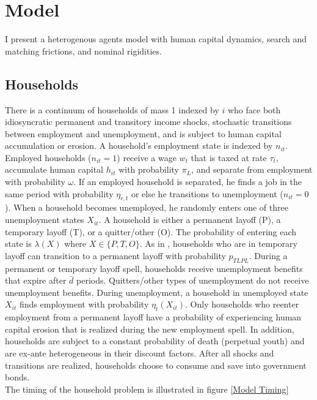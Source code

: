 
\section{Model} 


I present a heterogenous agents model with human capital dynamics, search and matching frictions, and nominal rigidities. 

\subsection{Households}
\label{subsec:Households}

There is a continuum of households of mass 1 indexed by $i$ who face both idiosyncratic permanent and transitory income shocks, stochastic transitions between employment and unemployment, and is subject to human capital accumulation or erosion. A household's employment state is indexed by $n_{it}$. Employed households ($n_{it} = 1$) receive a wage $w_{t}$ that is taxed at rate $\tau_{t}$, accumulate human capital $h_{it}$ with probability $\pi_{L}$, and separate from employment with probability $\omega$. If an employed household is separated, he finds a job in the same period with probability $\eta_{r,t}$ or else he transitions to unemployment ($n_{it} = 0$).  When a household becomes unemployed, he randomly enters one of three unemployment states $X_{it}$. A household is either a permanent layoff (P), a temporary layoff (T), or a quitter/other (O). The probability of entering each state is $\lambda(X)$ where $X \in \{ P , T , O \}$. As in \cite{Gertler2022}, households who are in temporary layoff can transition to a permanent layoff with probability $p_{TLPL}$.  During a permanent or temporary layoff spell, households receive unemployment benefits that expire after $\bar{d}$ periods. Quitters/other types of unemployment do not receive unemployment benefits. During unemployment, a household in unemployed state $X_{it}$ finds employment with probability $\eta_{t}(X_{it})$. Only households who reenter employment from a permanent layoff have a probability of experiencing human capital erosion that is realized during the new employment spell. In addition, households are subject to a constant probability of death (perpetual youth) and are ex-ante heterogeneous in their discount factors. After all shocks and transitions are realized, households choose to consume and save into government bonds. \\ 

The timing of the household problem is illustrated in figure \ref{Model Timing}


